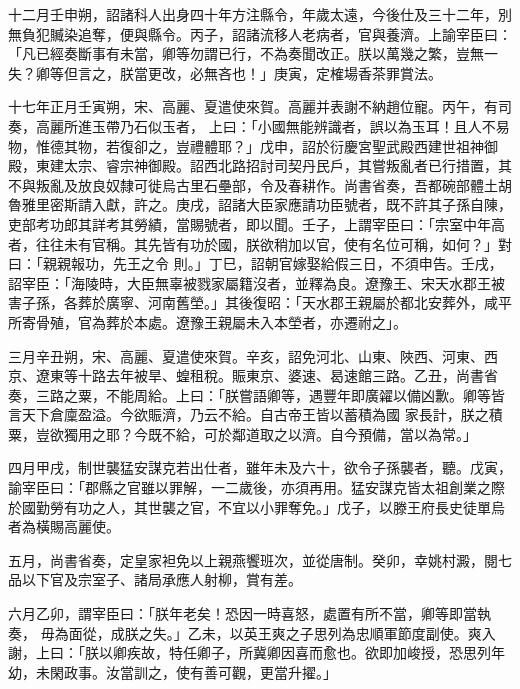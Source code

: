 \begin{pinyinscope}
 十二月壬申朔，詔諸科人出身四十年方注縣令，年歲太遠，今後仕及三十二年，別無負犯贓染追奪，便與縣令。丙子，詔諸流移人老病者，官與養濟。上諭宰臣曰：「凡已經奏斷事有未當，卿等勿謂已行，不為奏聞改正。朕以萬幾之繁，豈無一失？卿等但言之，朕當更改，必無吝也！」庚寅，定榷場香茶罪賞法。



 十七年正月壬寅朔，宋、高麗、夏遣使來賀。高麗并表謝不納趙位寵。丙午，有司奏，高麗所進玉帶乃石似玉者，
 上曰：「小國無能辨識者，誤以為玉耳！且人不易物，惟德其物，若復卻之，豈禮體耶？」戊申，詔於衍慶宮聖武殿西建世祖神御殿，東建太宗、睿宗神御殿。詔西北路招討司契丹民戶，其嘗叛亂者已行措置，其不與叛亂及放良奴隸可徙烏古里石壘部，令及春耕作。尚書省奏，吾都碗部體土胡魯雅里密斯請入獻，許之。庚戌，詔諸大臣家應請功臣號者，既不許其子孫自陳，吏部考功郎其詳考其勞績，當賜號者，即以聞。壬子，上謂宰臣曰：「宗室中年高者，往往未有官稱。其先皆有功於國，朕欲稍加以官，使有名位可稱，如何？」對曰：「親親報功，先王之令
 則。」丁巳，詔朝官嫁娶給假三日，不須申告。壬戌，詔宰臣：「海陵時，大臣無辜被戮家屬籍沒者，並釋為良。遼豫王、宋天水郡王被害子孫，各葬於廣寧、河南舊塋。」其後復昭：「天水郡王親屬於都北安葬外，咸平所寄骨殖，官為葬於本處。遼豫王親屬未入本塋者，亦遷祔之」。



 三月辛丑朔，宋、高麗、夏遣使來賀。辛亥，詔免河北、山東、陜西、河東、西京、遼東等十路去年被旱、蝗租稅。賑東京、婆速、曷速館三路。乙丑，尚書省奏，三路之粟，不能周給。上曰：「朕嘗語卿等，遇豐年即廣糴以備凶歉。卿等皆言天下倉廩盈溢。今欲賑濟，乃云不給。自古帝王皆以蓄積為國
 家長計，朕之積粟，豈欲獨用之耶？今既不給，可於鄰道取之以濟。自今預備，當以為常。」



 四月甲戌，制世襲猛安謀克若出仕者，雖年未及六十，欲令子孫襲者，聽。戊寅，諭宰臣曰：「郡縣之官雖以罪解，一二歲後，亦須再用。猛安謀克皆太祖創業之際於國勤勞有功之人，其世襲之官，不宜以小罪奪免。」戊子，以滕王府長史徒單烏者為橫賜高麗使。



 五月，尚書省奏，定皇家袒免以上親燕饗班次，並從唐制。癸卯，幸姚村澱，閱七品以下官及宗室子、諸局承應人射柳，賞有差。



 六月乙卯，謂宰臣曰：「朕年老矣！恐因一時喜怒，處置有所不當，卿等即當執奏，
 毋為面從，成朕之失。」乙未，以英王爽之子思列為忠順軍節度副使。爽入謝，上曰：「朕以卿疾故，特任卿子，所冀卿因喜而愈也。欲即加峻授，恐思列年幼，未閑政事。汝當訓之，使有善可觀，更當升擢。」




\end{pinyinscope}
